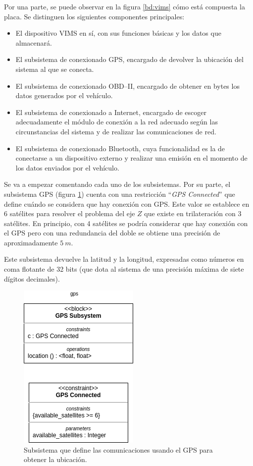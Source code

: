 Por una parte, se puede observar en la figura \ref{bd:vims} cómo está compuesta la placa.
Se distinguen los siguientes componentes principales:

\begin{itemize}
  \item El dispositivo \ac{VIMS} en sí, con sus funciones básicas y los datos que
        almacenará.
  \item El subsistema de conexionado \ac{GPS}, encargado de devolver la ubicación
        del sistema al que se conecta.
  \item El subsistema de conexionado \ac{OBD}--II, encargado de obtener en bytes
        los datos generados por el vehículo.
  \item El subsistema de conexionado a Internet, encargado de escoger adecuadamente
        el módulo de conexión a la red adecuado según las circunstancias del sistema
        y de realizar las comunicaciones de red.
  \item El subsistema de conexionado Bluetooth, cuya funcionalidad es la de conectarse
        a un dispositivo externo y realizar una emisión en el momento de los datos
        enviados por el vehículo.
\end{itemize}

Se va a empezar comentando cada uno de los subsistemas. Por su parte, el subsistema
\ac{GPS} (figura \ref{fig:bd-gps}) cuenta con una restricción ``\textit{GPS Connected}''
que define cuándo se considera que hay conexión con \ac{GPS}. Este valor se establece
en 6 satélites para resolver el problema del eje $Z$ que existe en trilateración con
3 satélites. En principio, con 4 satélites se podría considerar que hay conexión
con el \ac{GPS} pero con una redundancia del doble se obtiene una precisión de
aproximadamente $5~m$.

Este subsistema devuelve la latitud y la longitud, expresadas como números en coma
flotante de 32 bits (que dota al sistema de una precisión máxima de siete dígitos
decimales).

\begin{figure}[H]
  \centering
  \includegraphics[width=.3\linewidth]{images/BD-GPS.png}
  \caption{Subsistema que define las comunicaciones usando el \ac{GPS} para obtener la ubicación.}
  \label{fig:bd-gps}
\end{figure}

